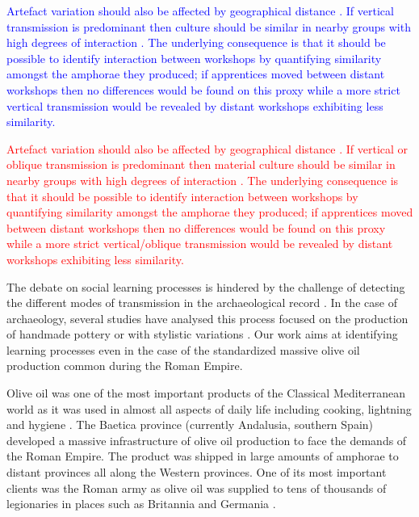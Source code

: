 \documentclass[review]{elsarticle}
\newcommand{\memo}[2]{\textcolor{#1}{#2}}
\newcommand{\maria}[1]{\memo{red}{#1\\}}
\newcommand{\revise}[1]{\memo{blue}{#1\\}}
\begin{document}
\revise{Artefact variation should also be affected by geographical distance \citep{bjorklund_effect_2010,shennan_isolation-by-distance_2015, van_strien_isolation-by-distance_2015}. If vertical transmission is predominant then culture should be similar in nearby groups with high degrees of interaction \citep{hart_effects_2012}. The underlying consequence is that it should be possible to identify interaction between workshops by quantifying similarity amongst the amphorae they produced; if apprentices moved between distant workshops then no differences would be found on this proxy while a more strict vertical transmission would be revealed by distant workshops exhibiting less similarity.}

\maria{Artefact variation should also be affected by geographical distance \citep{bjorklund_effect_2010,shennan_isolation-by-distance_2015, van_strien_isolation-by-distance_2015}. If vertical or oblique transmission is predominant then material culture should be similar in nearby groups with high degrees of interaction \citep{hart_effects_2012}. The underlying consequence is that it should be possible to identify interaction between workshops by quantifying similarity amongst the amphorae they produced; if apprentices moved between distant workshops then no differences would be found on this proxy while a more strict vertical/oblique transmission would be revealed by distant workshops exhibiting less similarity.}

The debate on social learning processes is hindered by the challenge of detecting the different modes of transmission in the archaeological record \citep{roux_standardization_2015}. In the case of archaeology, several studies have analysed this process focused on the production of handmade pottery \citep{steele_james_ceramic_2010} or with stylistic variations \citep{neiman_stylistic_1995, shennan_ceramic_2001}. Our work aims at identifying learning processes even in the case of the standardized massive olive oil production common during the Roman
Empire\citep{bevan_mediterranean_2014}. 

Olive oil was one of the most important products of the Classical Mediterranean world as it was used in almost all aspects of daily life including cooking, lightning and hygiene \citep{mattingly_d.j._oil_1988}. The Baetica province (currently Andalusia, southern Spain) developed a massive infrastructure of olive oil production to face the demands of the Roman Empire. The product was shipped in large amounts of amphorae to distant provinces all along the Western provinces. One of its most important clients was the Roman army as olive oil was supplied to tens of thousands of legionaries in places such as Britannia \citep{funari_economic_2005, monfort_britannia_1998} and Germania \citep{remesal_annona_1986}. 
\end{document}
